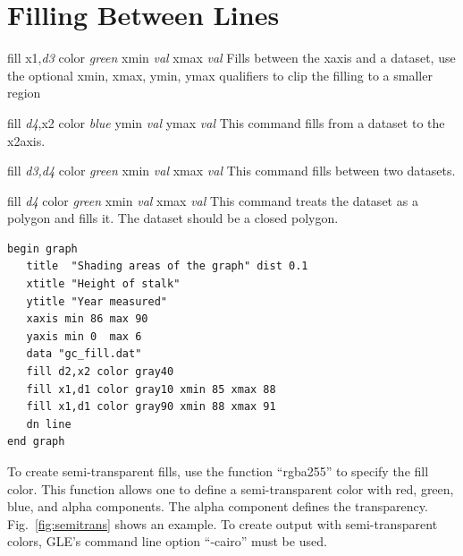 
\section{Filling Between Lines}
\label{cmd:fill}
\begin{commanddescription}
  
 
\item[{\sf fill x1,{\it d3} color {\it green}  xmin {\it val} xmax {\it val}} ]
Fills between the xaxis and a dataset, use the optional
{\sf xmin, xmax, ymin, ymax} qualifiers to clip the filling
to a smaller region

\item[{\sf fill {\it d4},x2 color {\it blue}   ymin {\it val} ymax {\it val}} ]
This command fills from a dataset to the x2axis.

\item[{\sf fill {\it d3,d4} color {\it green}  xmin {\it val} xmax {\it val}} ]
This command fills between two datasets.

\item[{\sf fill {\it d4} color {\it green}  xmin {\it val} xmax {\it val}} ]
This command treats the dataset as a polygon and fills it. The dataset
should be a closed polygon.

\begin{minipage}[c]{8cm}
\begin{Verbatim}
begin graph
   title  "Shading areas of the graph" dist 0.1
   xtitle "Height of stalk"
   ytitle "Year measured"
   xaxis min 86 max 90
   yaxis min 0  max 6
   data "gc_fill.dat"
   fill d2,x2 color gray40
   fill x1,d1 color gray10 xmin 85 xmax 88
   fill x1,d1 color gray90 xmin 88 xmax 91
   dn line
end graph
\end{Verbatim}
\end{minipage}
\hfill
\begin{minipage}[c]{7cm}
\mbox{}
\end{minipage}

\end{commanddescription}

To create semi-transparent fills, use the function ``rgba255'' to specify the fill color. This function allows one to define a semi-transparent color with red, green, blue, and alpha components. The alpha component defines the transparency. Fig.~\ref{fig:semitrans} shows an example. To create output with semi-transparent colors, GLE's command line option ``-cairo'' must be used.

